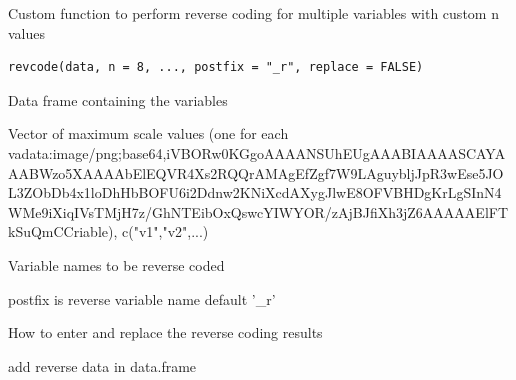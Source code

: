 \documentclass[a4paper]{book}
\begin{document}
%
\begin{Description}
Custom function to perform reverse coding for multiple variables with custom n values
\end{Description}
%
\begin{Usage}
\begin{verbatim}
revcode(data, n = 8, ..., postfix = "_r", replace = FALSE)
\end{verbatim}
\end{Usage}
%
\begin{Arguments}
\begin{ldescription}
\item[\code{data}] Data frame containing the variables

\item[\code{n}] Vector of maximum scale values (one for each vadata:image/png;base64,iVBORw0KGgoAAAANSUhEUgAAABIAAAASCAYAAABWzo5XAAAAbElEQVR4Xs2RQQrAMAgEfZgf7W9LAguybljJpR3wEse5JOL3ZObDb4x1loDhHbBOFU6i2Ddnw2KNiXcdAXygJlwE8OFVBHDgKrLgSInN4WMe9iXiqIVsTMjH7z/GhNTEibOxQswcYIWYOR/zAjBJfiXh3jZ6AAAAAElFTkSuQmCCriable), c("v1","v2",...)

\item[\code{...}] Variable names to be reverse coded

\item[\code{postfix}] postfix is reverse variable name default '\_r'

\item[\code{replace}] How to enter and replace the reverse coding results
\end{ldescription}
\end{Arguments}
%
\begin{Value}
add reverse data in data.frame
\end{Value}
%
\end{document}
